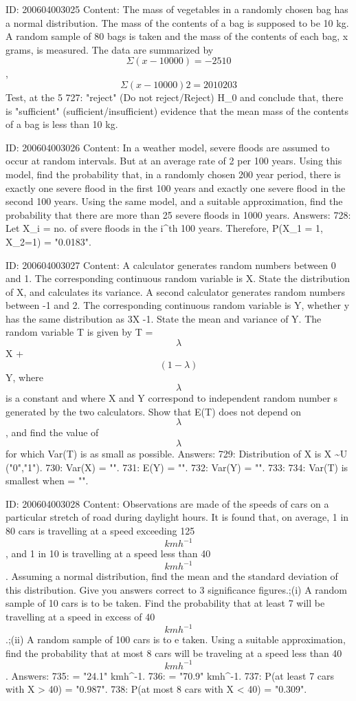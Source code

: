 \documentclass{article}
\begin{document}
ID: 200604003025
Content:
The mass of vegetables in a randomly chosen bag has a normal distribution. The mass of the contents of a bag is supposed to be 10 kg. A random sample of 80 bags is taken and the mass of the contents of each bag, x grams, is measured. The data are summarized by  $$\Sigma (x-10000) = -2510$$,  $$\Sigma (x-10000)2 = 2010203$$ Test, at the 5%
727: "reject" (Do not reject/Reject) H_0 and conclude that, there is "sufficient" (sufficient/insufficient) evidence that the mean mass of the contents of a bag is less than 10 kg.

ID: 200604003026
Content:
In a weather model, severe floods are assumed to occur at random intervals. But at an average rate of 2 per 100 years. Using this model, find the probability that, in a randomly chosen 200 year period, there is exactly one severe flood in the first 100 years and exactly one severe flood in the second 100 years.  Using the same model, and a suitable approximation, find the probability that there are more than 25 severe floods in 1000 years. Answers:
728: Let X_i = no. of svere floods in the i^{th} 100 years. Therefore, P(X_1 = 1, X_2=1) = "0.0183".

ID: 200604003027
Content:
A calculator generates random numbers between 0 and 1. The corresponding continuous random variable is X. State the distribution of X, and calculates its variance.  A second calculator generates random numbers between -1 and 2. The corresponding continuous random variable is Y, whether y has the same distribution as 3X -1. State the mean and variance of Y.  The random variable T is given by T = $$\lambda$$ X + $$(1-\lambda)$$Y, where $$\lambda$$ is a constant and where X and Y correspond to independent random number s generated by the two calculators. Show that E(T) does not depend on $$\lambda$$, and find the value of $$\lambda$$ for which Var(T) is as small as possible. Answers:
729: Distribution of X is X \sim U ("0","1").
730: Var(X) = "".
731: E(Y) = "".
732: Var(Y) = "".
733: 
734: Var(T) is smallest when \lambda = "".

ID: 200604003028
Content:
Observations are made of the speeds of cars on a particular stretch of road during daylight hours. It is found that, on average, 1 in 80 cars is travelling at a speed exceeding 125 $$km h^{-1}$$, and 1 in 10 is travelling at a speed less than 40 $$km h^{-1}$$. Assuming a normal distribution, find the mean and the standard deviation of this distribution. Give you answers correct to 3 significance figures.;(i) A random sample of 10 cars is to be taken. Find the probability that at least 7 will be travelling at a speed in excess of 40 $$km h^{-1}$$.;(ii) A random sample of 100 cars is to e taken. Using a suitable approximation, find the probability that at most 8 cars will be traveling at a speed less than 40 $$km h^{-1}$$. Answers:
735: \sigma = "24.1" kmh^{-1}.
736: \mu = "70.9" kmh^{-1}.
737: P(at least 7 cars with X > 40) = "0.987".
738: P(at most 8 cars with X < 40) = "0.309".
\end{document}
